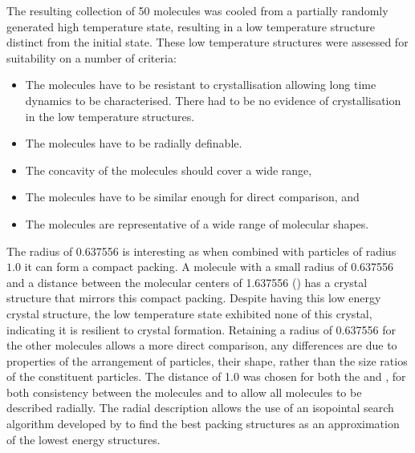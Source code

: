 The resulting collection of 50 molecules was cooled from a partially randomly generated high temperature state, resulting in a low temperature structure distinct from the initial state. These low temperature structures were assessed for suitability on a number of criteria:
\begin{itemize}
    \item The molecules have to be resistant to crystallisation allowing long time dynamics to be characterised. There had to be no evidence of crystallisation in the low temperature structures.
    \item The molecules have to be radially definable.
    \item The concavity of the molecules should cover a wide range,
    \item The molecules have to be similar enough for direct comparison, and
    \item The molecules are representative of a wide range of molecular shapes.
\end{itemize}
The radius of 0.637556 is interesting as when combined with particles of radius $1.0$ it can form a compact packing. A molecule with a small radius of 0.637556 and a distance between the molecular centers of 1.637556 (\scon) has a crystal structure that mirrors this compact packing. Despite \scon having this low energy crystal structure, the low temperature state exhibited none of this crystal, indicating it is resilient to crystal formation. Retaining a radius of 0.637556 for the other molecules allows a more direct comparison, any differences are due to properties of the arrangement of particles, their shape, rather than the size ratios of the constituent particles. The distance of 1.0 was chosen for both the \tri and \sone, for both consistency between the molecules and to allow all molecules to be described radially. The radial description allows the use of an isopointal search algorithm developed by \textcite{hudson:10} to find the best packing structures as an approximation of the lowest energy structures.

